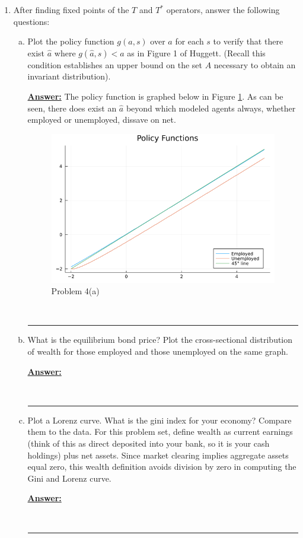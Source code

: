 \documentclass{article} %
\theoremstyle{definition}
\newenvironment{solution}[1][Answer]{\begin{singlespace}\underline{\textbf{#1:}}\quad }{\ \rule{0.3em}{0.3em}\end{singlespace}} %
\begin{document}
\begin{enumerate}[I.]
		\begin{enumerate}[4.]
			\item After finding fixed points of the $ T $ and $ T^* $ operators, answer the following questions:
			\begin{enumerate}[a.]
				\item  Plot the policy function $ g(a, s) $ over $ a $ for each $ s $ to verify that there exist $ \hat{a} $ where
				$ g(\hat{a}, s) < \hat{a} $ as in Figure 1 of Huggett. (Recall this condition establishes an upper bound on
				the set $ A $ necessary to obtain an invariant distribution).
				\begin{solution}
					The policy function is graphed below in Figure \ref{4a}. As can be seen, there does exist an $\hat{a}$ beyond which modeled agents always, whether employed or unemployed, dissave on net. 
					\begin{figure}[htbp!]
					\centering
					\includegraphics[scale=.5]{ForIncludingInDocument/02_ryan_Policy_Functions.png}
					\caption{Problem 4(a) \label{4a}}
					\end{figure}
				\end{solution}
			
				\item What is the equilibrium bond price? Plot the cross-sectional distribution of wealth for those employed and those unemployed on the same graph.
				\begin{solution}
					
				\end{solution}
			
				\item Plot a Lorenz curve. What is the gini index for your economy? Compare them to the data. For this problem set, define wealth as current earnings (think of this as direct deposited
				into your bank, so it is your cash holdings) plus net assets. Since market clearing implies aggregate assets equal zero, this wealth definition avoids division by zero in computing the Gini and Lorenz curve.
				\begin{solution}
					

\end{solution}
\end{enumerate}
\end{enumerate}
\end{enumerate}
\end{document}
